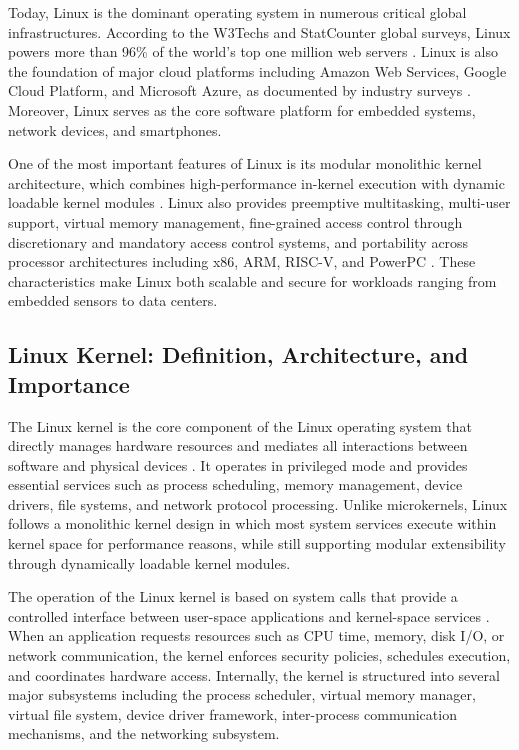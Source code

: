 \documentclass{mnitjaipur}
\begin{document}
\noindent
Today, Linux is the dominant operating system in numerous critical global infrastructures. According to the W3Techs and StatCounter global surveys, Linux powers more than 96\% of the world’s top one million web servers \cite{w3techs2024, statcounter2024, linuxfoundation2023}. Linux is also the foundation of major cloud platforms including Amazon Web Services, Google Cloud Platform, and Microsoft Azure, as documented by industry surveys \cite{cloudlinux2023, linuxfoundation2023}. Moreover, Linux serves as the core software platform for embedded systems, network devices, and smartphones.

\noindent
One of the most important features of Linux is its modular monolithic kernel architecture, which combines high-performance in-kernel execution with dynamic loadable kernel modules \cite{love2010linux}. Linux also provides preemptive multitasking, multi-user support, virtual memory management, fine-grained access control through discretionary and mandatory access control systems, and portability across processor architectures including x86, ARM, RISC-V, and PowerPC \cite{silberschatz2018os}. These characteristics make Linux both scalable and secure for workloads ranging from embedded sensors to data centers.

\subsection{Linux Kernel: Definition, Architecture, and Importance}

The Linux kernel is the core component of the Linux operating system that directly manages hardware resources and mediates all interactions between software and physical devices \cite{love2010linux}. It operates in privileged mode and provides essential services such as process scheduling, memory management, device drivers, file systems, and network protocol processing. Unlike microkernels, Linux follows a monolithic kernel design in which most system services execute within kernel space for performance reasons, while still supporting modular extensibility through dynamically loadable kernel modules.

\noindent
The operation of the Linux kernel is based on system calls that provide a controlled interface between user-space applications and kernel-space services \cite{tannenbaum2014os}. When an application requests resources such as CPU time, memory, disk I/O, or network communication, the kernel enforces security policies, schedules execution, and coordinates hardware access. Internally, the kernel is structured into several major subsystems including the process scheduler, virtual memory manager, virtual file system, device driver framework, inter-process communication mechanisms, and the networking subsystem.
\end{document}
